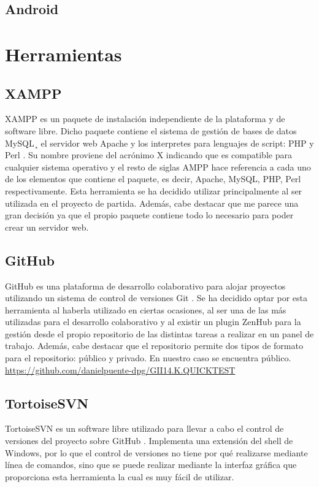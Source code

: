 \subsection{Android}

\section{Herramientas}

\subsection{XAMPP}

XAMPP es un paquete de instalación independiente de la plataforma y de software libre. Dicho paquete contiene el sistema de gestión de bases de datos MySQL¸ el servidor web Apache y los interpretes para lenguajes de script: PHP y Perl \cite{wiki:xampp}. Su nombre proviene del acrónimo X indicando que es compatible para cualquier sistema operativo y el resto de siglas AMPP hace referencia a cada uno de los elementos que contiene el paquete, es decir, Apache, MySQL, PHP, Perl respectivamente.
Esta herramienta se ha decidido utilizar principalmente al ser utilizada en el proyecto de partida. Además, cabe destacar que me parece una gran decisión ya que el propio paquete contiene todo lo necesario para poder crear un servidor web.

\subsection{GitHub}

GitHub es una plataforma de desarrollo colaborativo para alojar proyectos utilizando un sistema de control de versiones Git \cite{wiki:github}. 
Se ha decidido optar por esta herramienta al haberla utilizado en ciertas ocasiones, al ser una de las más utilizadas para el desarrollo colaborativo y al existir un plugin ZenHub para la gestión desde el propio repositorio de las distintas tareas a realizar en un panel de trabajo. Además, cabe destacar que el repositorio permite dos tipos de formato para el repositorio: público y privado. En nuestro caso se encuentra público. \url{https://github.com/danielpuente-dpg/GII14.K.QUICKTEST}

\subsection{TortoiseSVN}

TortoiseSVN es un software libre utilizado para llevar a cabo el control de versiones del proyecto sobre GitHub \cite{wiki:tortoisesvn}. Implementa una extensión del shell de Windows, por lo que el control de versiones no tiene por qué realizarse mediante línea de comandos, sino que se puede realizar mediante la interfaz gráfica que proporciona esta herramienta la cual es muy fácil de utilizar.

